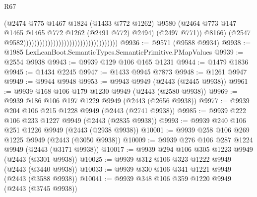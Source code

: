 \begin{lexlean}{R67}
\begin{coremodule}
                                                                          (@2474
                                                                            @775
                                                                            @1467
                                                                            @1824
                                                                            (@1433 @772 @1262)
                                                                            @9580
                                                                            (@2464
                                                                              @773
                                                                              @147
                                                                              @1465
                                                                              @1465
                                                                              @772
                                                                              @1262
                                                                              (@2491 @772)
                                                                              @2494)
                                                                            (@2497 @771))
                                                                          @8166)
                                                                        (@2547
                                                                          @9582)))))))))))))))))))))))))))))))))))
@9936 := @9571 (@9588 @9934)
@9938 := @1985 LexLeanBoot.SemanticTypes.SemanticPrimitive.PMapValues
@9939 := @2554 @9938
@9943 := @9939 @129 @106 @165 @1231
@9944 := @1479 @1836
@9945 := @1434 @2245
@9947 := @1433 @9945 @7873
@9948 := @1261 @9947
@9949 := @9944 @9948
@9953 := @9943 @9949 (@2443 (@2445 @9938))
@9961 := @9939 @168 @106 @179 @1230 @9949 (@2443 (@2580 @9938))
@9969 := @9939 @186 @106 @197 @1229 @9949 (@2443 (@2656 @9938))
@9977 := @9939 @204 @106 @215 @1228 @9949 (@2443 (@2741 @9938))
@9985 := @9939 @222 @106 @233 @1227 @9949 (@2443 (@2835 @9938))
@9993 := @9939 @240 @106 @251 @1226 @9949 (@2443 (@2938 @9938))
@10001 := @9939 @258 @106 @269 @1225 @9949 (@2443 (@3050 @9938))
@10009 := @9939 @276 @106 @287 @1224 @9949 (@2443 (@3171 @9938))
@10017 := @9939 @294 @106 @305 @1223 @9949 (@2443 (@3301 @9938))
@10025 := @9939 @312 @106 @323 @1222 @9949 (@2443 (@3440 @9938))
@10033 := @9939 @330 @106 @341 @1221 @9949 (@2443 (@3588 @9938))
@10041 := @9939 @348 @106 @359 @1220 @9949 (@2443 (@3745 @9938))

\end{coremodule}
\end{lexlean}
